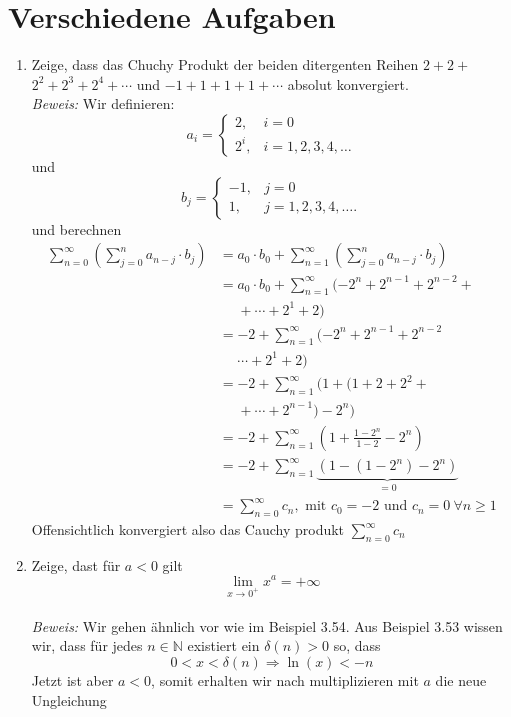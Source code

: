 \documentclass[a4paper,8pt]{extarticle}
\begin{document}
\section{Verschiedene Aufgaben}
\begin{enumerate}
  \item Zeige, dass das Chuchy Produkt der beiden ditergenten Reihen $2+2+$ $2^{2}+2^{3}+2^{4}+\cdots$ und $-1+1+1+1+\cdots$ absolut konvergiert. \\
\textit{Beweis:} Wir definieren:
$$
a_{i}= \begin{cases}2, & i=0 \\ 2^{i}, & i=1,2,3,4, \ldots\end{cases}
$$
und
$$
b_{j}= \begin{cases}-1, & j=0 \\ 1, & j=1,2,3,4, \ldots .\end{cases}
$$
und berechnen
$$
\begin{aligned}
\sum_{n=0}^{\infty}\left(\sum_{j=0}^{n} a_{n-j} \cdot b_{j}\right) 
&=a_{0} \cdot b_{0}+\sum_{n=1}^{\infty}\left(\sum_{j=0}^{n} a_{n-j} \cdot b_{j}\right) \\
&=a_{0} \cdot b_{0}+\sum_{n=1}^{\infty}(-2^{n}+2^{n-1}+2^{n-2}+ \\ &\ \ \ \ \ \ +\cdots+2^{1}+2) \\
&=-2+\sum_{n=1}^{\infty}(-2^{n}+2^{n-1}+2^{n-2} \\ &\ \ \ \ \ \ \cdots+2^{1}+2) \\
&=-2+\sum_{n=1}^{\infty}(1+(1+2+2^{2}+\\ &\ \ \ \ \ \ +\cdots+2^{n-1})-2^{n}) \\
&=-2+\sum_{n=1}^{\infty}\left(1+\frac{1-2^{n}}{1-2}-2^{n}\right) \\
&=-2+\sum_{n=1}^{\infty} \underbrace{\left(1-\left(1-2^{n}\right)-2^{n}\right)}_{=0} \\
&=\sum_{n=0}^{\infty} c_{n}, \text { mit } c_{0}=-2 \text { und } c_{n}=0 \ \forall n \geq 1
\end{aligned}
$$
Offensichtlich konvergiert also das Cauchy produkt $\sum_{n=0}^{\infty} c_{n}$
\item Zeige, dast für $a<0$ gilt
$$
\lim _{x \rightarrow 0^{+}} x^{a}=+\infty
$$  \\
\noindent\textit{Beweis:} Wir gehen ähnlich vor wie im Beispiel 3.54. Aus Beispiel 3.53 wissen wir, dass für jedes $n \in \mathbb{N}$ existiert ein $\delta(n)>0$ so, dass
$$
0<x<\delta(n) \Longrightarrow \ln (x)<-n
$$
Jetzt ist aber $a<0$, somit erhalten wir nach multiplizieren mit $a$ die neue Ungleichung

\end{enumerate}
\end{document}
